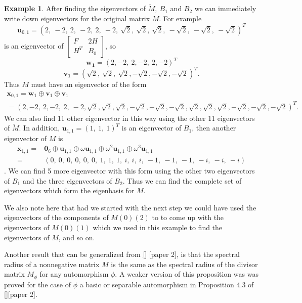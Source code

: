 \documentclass[preprint,12pt]{elsarticle}
\theoremstyle{definition}
\newtheorem{example}[thm]{Example}
\theoremstyle{remark}
\begin{document}
\begin{example}
After finding the eigenvectors of $\tilde{M},\ B_1$ and $B_2$ we can immediately write down eigenvectors for the original matrix $M$. For example $$\mathbf{u}_{0,1}=(2,\ -2,\ 2,\ -2,\ 2,\ -2,\ \sqrt{2},\ \sqrt{2},\ \sqrt{2},\ -\sqrt{2},\ -\sqrt{2},\ -\sqrt{2})^T $$ is an eigenvector of $\left[\begin{matrix}
F & 2H \\
H^T & B_0 \end{matrix}\right]$, so $$\mathbf{w_1}=(2, -2,\ 2, -2,\ 2, -2)^T$$ $$\mathbf{v_1}=(\sqrt{2},\ \sqrt{2},\ \sqrt{2}, -\sqrt{2}, -\sqrt{2}, -\sqrt{2})^T.$$  Thus $M$ must have an eigenvector of the form
\begin{multline*}\mathbf{x}_{0,1}=\mathbf{w}_1\oplus\mathbf{v}_1\oplus\mathbf{v}_1\\
=(2, -2,\ 2, -2,\ 2,\ -2, \sqrt{2}, \sqrt{2}, \sqrt{2}, -\sqrt{2}, -\sqrt{2}, -\sqrt{2},\sqrt{2}, \sqrt{2}, \sqrt{2}, -\sqrt{2}, -\sqrt{2}, -\sqrt{2})^T.\end{multline*}  We can also find 11 other eigenvector in this way using the other 11 eigenvectors of $\tilde{M}$. In addition, $\mathbf{u}_{1,1}=(1,\ 1,\ 1)^T$ is an eigenvector of  $B_1$, then another eigenvector of $M$ is \begin{align*}
\mathbf{x}_{1,1}=&\mathbf{0}_6\oplus\mathbf{u}_{1,1}\oplus\omega\mathbf{u}_{1,1}\oplus\omega^2\mathbf{u}_{1,1}\oplus\omega^3\mathbf{u}_{1,1}\\
=&(0,\ 0,\ 0,\ 0,\ 0,\ 0,\ 1,\ 1,\ 1,\ i,\ i,\ i,\ -1,\ -1,\ -1,\ -i,\ -i,\ -i)
\end{align*}.  We can find 5 more eigenvector with this form using the other two eigenvectors of $B_1$ and the three eigenvectors of $B_2$. Thus we can find the complete set of eigenvectors which form the eigenbasis for $M$.

We also note here that had we started with the next step we could have used the eigenvectors of the components of $M(0)(2)$ to to come up with the eigenvectors of $M(0)(1)$ which we used in this example to find the eigenvectors of $M$, and so on.
\end{example}

Another result that can be generalized from \ref{} [paper 2], is that the spectral radius of a nonnegative matrix $M$ is the same as the spectral radius of the divisor matrix $M_\phi$ for any automorphism $\phi$.  A weaker version of this proposition was was proved for the case of $\phi$ a basic or separable automorphism in Proposition 4.3 of \ref{}[paper 2].
\end{document}
